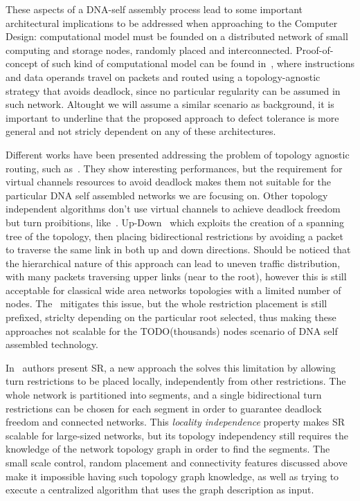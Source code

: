 \documentclass[final,journal,letterpaper]{IEEEtran}
\begin{document}
These aspects of a DNA-self assembly process lead to some important
architectural implications to be addressed when approaching to the
Computer Design: computational model must be founded on a distributed
network of small computing and storage nodes, randomly placed and
interconnected.  Proof-of-concept of such kind of computational model
can be found in~\cite{}, where instructions and data operands travel
on packets and routed using a topology-agnostic strategy that avoids
deadlock, since no particular regularity can be assumed in such
network. Altought we will assume a similar scenario as background, it
is important to underline that the proposed approach to defect
tolerance is more general and not stricly dependent on any of these
architectures.

Different works have been presented addressing the problem of topology
agnostic routing, such as~\cite{}. They show interesting
performances, but the requirement for virtual channels resources 
to avoid deadlock makes them not suitable for the particular DNA self
assembled networks we are focusing on. 
Other topology independent algorithms don't use virtual channels to
achieve deadlock freedom but turn proibitions, like~\cite{}.
Up-Down~\cite{} which exploits the creation of a spanning tree of the
topology, then placing bidirectional restrictions by avoiding a packet
to traverse the same link in both up and down directions. Should be
noticed that the hierarchical nature of this approach can lead to uneven traffic
distribution, with many packets traversing upper links (near to the
root), however this is still acceptable for classical wide area networks
topologies with a limited number of nodes.  The~\cite{} mitigates this
issue, but the whole restriction placement is still prefixed,
striclty depending on the particular root selected, thus making these
approaches not scalable for the TODO(thousands) nodes scenario of DNA
self assembled technology.

In~\cite{} authors present SR, a new approach the solves this limitation by
allowing turn restrictions to be placed locally, independently from
other restrictions. The whole network is partitioned into segments, and a
single bidirectional turn restrictions can be chosen for each
segment in order to guarantee deadlock freedom and connected networks.
This \emph{locality independence} property makes SR scalable for large-sized networks,
but its topology independency still requires the knowledge of the
network topology graph in order to find the segments. The small scale control,
random placement and connectivity features discussed above
make it impossible having such topology graph knowledge, as well as
trying to execute a centralized algorithm that uses the graph description as input.
\end{document}
